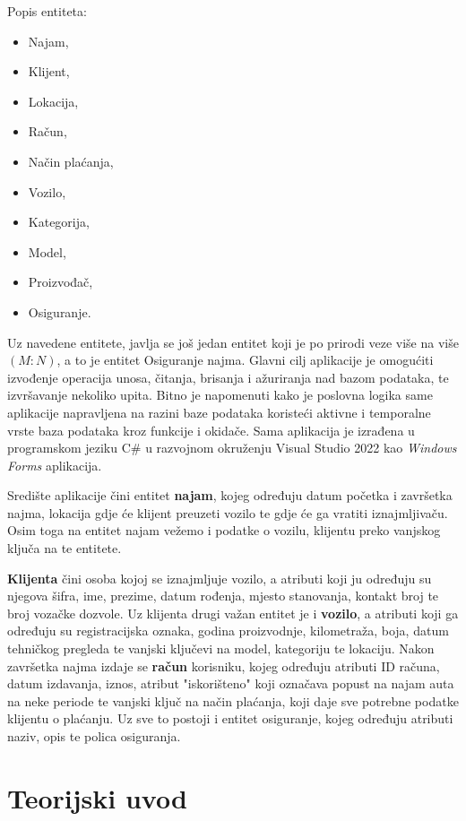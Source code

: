 \documentclass[]{foi} %
\begin{document}
Popis entiteta:
\begin{itemize}
  \item Najam,
  \item Klijent,
  \item Lokacija,
  \item Račun,
  \item Način plaćanja,
  \item Vozilo,
  \item Kategorija,
  \item Model,
  \item Proizvođač,
  \item Osiguranje.
\end{itemize}

Uz navedene entitete, javlja se još jedan entitet koji je po prirodi veze više na više $(M:N)$, a to je entitet Osiguranje najma. Glavni cilj aplikacije je omogućiti izvođenje operacija unosa, čitanja, brisanja i ažuriranja nad bazom podataka, te izvršavanje nekoliko upita. Bitno je napomenuti kako je poslovna logika same aplikacije napravljena na razini baze podataka koristeći aktivne i temporalne vrste baza podataka kroz funkcije i okidače. Sama aplikacija je izrađena u programskom jeziku C\# u razvojnom okruženju Visual Studio 2022 kao \textit{Windows Forms} aplikacija.

Središte aplikacije čini entitet \textbf{najam}, kojeg određuju datum početka i završetka najma, lokacija gdje će klijent preuzeti vozilo te gdje će ga vratiti iznajmljivaču. Osim toga na entitet najam vežemo i podatke o vozilu, klijentu preko vanjskog ključa na te entitete.

\textbf{Klijenta} čini osoba kojoj se iznajmljuje vozilo, a atributi koji ju određuju su njegova šifra, ime, prezime, datum rođenja, mjesto stanovanja, kontakt broj te broj vozačke dozvole. Uz klijenta drugi važan entitet je i \textbf{vozilo}, a atributi koji ga određuju su registracijska oznaka, godina proizvodnje, kilometraža, boja, datum tehničkog pregleda te vanjski ključevi na model, kategoriju te lokaciju. Nakon završetka najma izdaje se \textbf{račun} korisniku, kojeg određuju atributi ID računa, datum izdavanja, iznos, atribut "iskorišteno" koji označava popust na najam auta na neke periode te vanjski ključ na način plaćanja, koji daje sve potrebne podatke klijentu o plaćanju. Uz sve to postoji i entitet osiguranje, kojeg određuju atributi naziv, opis te polica osiguranja.

\chapter{Teorijski uvod}
\end{document}
